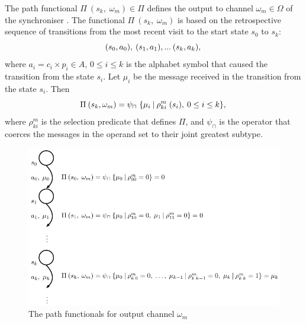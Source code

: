 The path functional $\Pi \: (s_k, \; \omega_m) \in \Pi$ defines the output to channel $\omega_m \in \Omega$ of the synchroniser . The functional $\Pi \: (s_k, \; \omega_m)$ is based on the retrospective sequence of transitions from the most recent visit to the start state $s_{0}$ to $s_{k}$:
\begin{equation}
(s_{0}, a_{0}), \: (s_{1}, a_{1}),... \: (s_{k}, a_{k}),\\\nonumber
\end{equation}
where $a_i = c_i \times p_i \in A$, $0 \le i \le k$ is the alphabet symbol that caused the transition from the state $s_{i}$. Let $\mu_{i}$ be the message received in the transition from the state $s_{i}$. Then
\begin{equation}
\Pi \: (s_{k}, \omega_{m}) = \psi_{\sqcap} \; \{\mu_{i} \: | \: \rho_{ki}^{m} \; (s_{i}), \: 0 \le i \le k\},\\\label{predic}
\end{equation}
where $\rho_{ki}^{m}$ is the selection predicate that defines $\Pi$, and $\psi_{\sqcap}$ is the operator that coerces the messages in the operand set to their joint greatest subtype.

  \begin{figure}[here]
  \centering
  \includegraphics[scale=0.8]{figs/chapter_02_math_exec.pdf}
  \caption{The path functionals for output channel $\omega_m$}
  \label{fig:math_exec}
  \end{figure}

